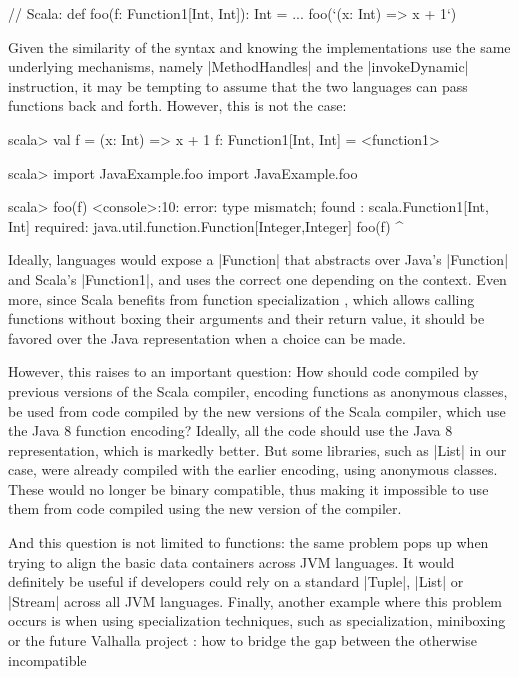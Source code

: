 \begin{lstlisting-nobreak}
// Scala:
def foo(f: Function1[Int, Int]): Int = { ... }
foo(`(x: Int) => x + 1`)
\end{lstlisting-nobreak}

Given the similarity of the syntax and knowing the implementations use the same underlying mechanisms, namely |MethodHandles| and the |invokeDynamic| instruction, it may be tempting to assume that the two languages can pass functions back and forth. However, this is not the case:

\begin{lstlisting-nobreak}
scala> val f = (x: Int) => x + 1
f: Function1[Int, Int] = <function1>

scala> import JavaExample.foo
import JavaExample.foo

scala> foo(f)
<console>:10: error: type mismatch;
 found   : scala.Function1[Int, Int]
 required: java.util.function.Function[Integer,Integer]
              foo(f)
                  ^
\end{lstlisting-nobreak}

Ideally, languages would expose a |Function| that abstracts over Java's |Function| and Scala's |Function1|, and uses the correct one depending on the context. Even more, since Scala benefits from function specialization \cite{iuli-thesis}, which allows calling functions without boxing their arguments and their return value, it should be favored over the Java representation when a choice can be made. 


However, this raises to an important question: How should code compiled by previous versions of the Scala compiler, encoding functions as anonymous classes, be used from code compiled by the new versions of the Scala compiler, which use the Java 8 function encoding? Ideally, all the code should use the Java 8 representation, which is markedly better. But some libraries, such as |List| in our case, were already compiled with the earlier encoding, using anonymous classes. These would no longer be binary compatible, thus making it impossible to use them from code compiled using the new version of the compiler.

And this question is not limited to functions: the same problem pops up when trying to align the basic data containers across JVM languages. It would definitely be useful if developers could rely on a standard |Tuple|, |List| or |Stream| across all JVM languages. Finally, another example where this problem occurs is when using specialization techniques, such as specialization, miniboxing or the future Valhalla project \cite{}: how to bridge the gap between the otherwise incompatible

